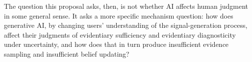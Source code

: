 The question this proposal asks, then, is not whether AI affects human judgment in some general sense. It asks a more specific mechanism question: how does generative AI, by changing users' understanding of the signal-generation process, affect their judgments of evidentiary sufficiency and evidentiary diagnosticity under uncertainty, and how does that in turn produce insufficient evidence sampling and insufficient belief updating?
